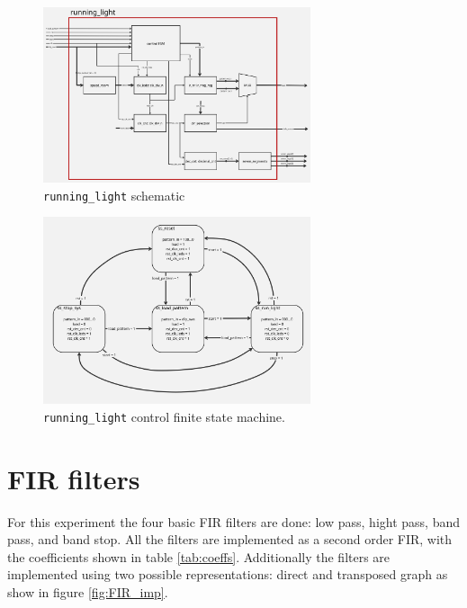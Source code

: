 \documentclass[12pt]{article}   	%
\begin{document}
\begin{figure}[htbp]
\begin{center}
\includegraphics[width=0.7\textwidth]{img/running_light_sch}
\caption{\lstinline|running_light| schematic}
\label{fig:running_light_sch}
\end{center}
\end{figure}

\begin{figure}[htbp]
\begin{center}
\includegraphics[width=0.7\textwidth]{img/running_light_fsm}
\caption{\lstinline|running_light| control finite state machine.}
\label{fig:running_light_fsm}
\end{center}
\end{figure}


\section{FIR filters}

For this experiment the four basic FIR filters are done: low pass, hight pass, band pass, and band stop. All the filters are implemented as a second order FIR, with the coefficients shown in table \ref{tab:coeffs}. Additionally the filters are implemented using two possible representations: direct and transposed graph as show in figure \ref{fig:FIR_imp}.
\end{document}
